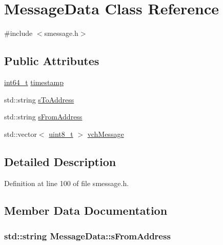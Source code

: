 \hypertarget{class_message_data}{}\section{Message\+Data Class Reference}
\label{class_message_data}


{\ttfamily \#include $<$smessage.\+h$>$}

\subsection*{Public Attributes}
\begin{DoxyCompactItemize}
\item 
\hyperlink{stdint_8h_adec1df1b8b51cb32b77e5b86fff46471}{int64\+\_\+t} \hyperlink{class_message_data_ab5afd561eaa6bc5f64a6c63de9b09f9d}{timestamp}
\item 
std\+::string \hyperlink{class_message_data_aada42ee21e633c6ac8031800942b0dff}{s\+To\+Address}
\item 
std\+::string \hyperlink{class_message_data_ab50857b301726898d38ca62031dc67ed}{s\+From\+Address}
\item 
std\+::vector$<$ \hyperlink{stdint_8h_aba7bc1797add20fe3efdf37ced1182c5}{uint8\+\_\+t} $>$ \hyperlink{class_message_data_a0a0a69a68866ee4810571e0e4dd05242}{vch\+Message}
\end{DoxyCompactItemize}


\subsection{Detailed Description}


Definition at line 100 of file smessage.\+h.



\subsection{Member Data Documentation}
\hypertarget{class_message_data_ab50857b301726898d38ca62031dc67ed}{}
\subsubsection[{s\+From\+Address}]{\setlength{\rightskip}{0pt plus 5cm}std\+::string Message\+Data\+::s\+From\+Address}\label{class_message_data_ab50857b301726898d38ca62031dc67ed}


